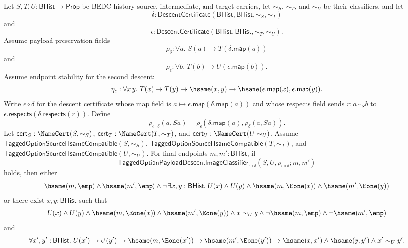 \begin{theorem}
Let $S,T,U:\mathsf{BHist}\to\mathsf{Prop}$ be BEDC history source,
intermediate, and target carriers, let $\sim_S$, $\sim_T$, and $\sim_U$ be their
classifiers, and let
$$
\delta:\mathsf{DescentCertificate}(\mathsf{BHist},\mathsf{BHist},\sim_S,\sim_T)
$$
and
$$
\epsilon:\mathsf{DescentCertificate}(\mathsf{BHist},\mathsf{BHist},\sim_T,\sim_U).
$$
Assume payload preservation fields
$$
\rho_{\delta}:\forall a.\;S(a)\to T(\delta.\mathsf{map}(a))
$$
and
$$
\rho_{\epsilon}:\forall b.\;T(b)\to U(\epsilon.\mathsf{map}(b)).
$$
Assume endpoint stability for the second descent:
$$
\eta_{\epsilon}:\forall x\,y.\;
T(x)\to T(y)\to \hsame(x,y)\to
\hsame(\epsilon.\mathsf{map}(x),\epsilon.\mathsf{map}(y)).
$$
Write $\epsilon\circ\delta$ for the descent certificate whose map field is
$a\mapsto\epsilon.\mathsf{map}(\delta.\mathsf{map}(a))$ and whose respects field
sends $r:a\sim_S b$ to
$\epsilon.\mathsf{respects}(\delta.\mathsf{respects}(r))$. Define
$$
\rho_{\epsilon\circ\delta}(a,Sa)=
\rho_{\epsilon}(\delta.\mathsf{map}(a),\rho_{\delta}(a,Sa)).
$$
Let $\mathsf{cert}_S:\NameCert(S,\sim_S)$,
$\mathsf{cert}_T:\NameCert(T,\sim_T)$, and
$\mathsf{cert}_U:\NameCert(U,\sim_U)$. Assume
$\mathsf{TaggedOptionSourceHsameCompatible}(S,\sim_S)$,
$\mathsf{TaggedOptionSourceHsameCompatible}(T,\sim_T)$, and
$\mathsf{TaggedOptionSourceHsameCompatible}(U,\sim_U)$. For final endpoints
$m,m':\mathsf{BHist}$, if
$$
\mathsf{TaggedOptionPayloadDescentImageClassifier}_{\epsilon\circ\delta}
(S,U,\rho_{\epsilon\circ\delta};m,m')
$$
holds, then either
$$
\hsame(m,\emp)\land \hsame(m',\emp)\land
\neg\exists x,y:\mathsf{BHist}.\;
U(x)\land U(y)\land
\hsame(m,\Eone(x))\land
\hsame(m',\Eone(y))
$$
or there exist $x,y:\mathsf{BHist}$ such that
$$
U(x)\land U(y)\land
\hsame(m,\Eone(x))\land
\hsame(m',\Eone(y))\land
x\sim_U y\land
\neg\hsame(m,\emp)\land
\neg\hsame(m',\emp)
$$
and
$$
\forall x',y':\mathsf{BHist}.\;
U(x')\to U(y')\to
\hsame(m,\Eone(x'))\to
\hsame(m',\Eone(y'))\to
\hsame(x,x')\land \hsame(y,y')\land x'\sim_U y'.
$$
\end{theorem}
